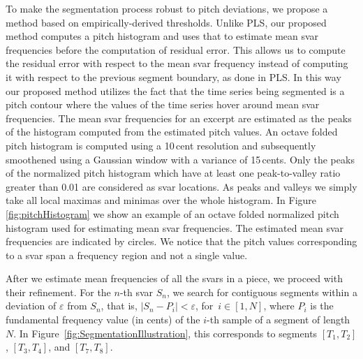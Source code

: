 {To make the segmentation process robust to pitch deviations, we propose a method based on empirically-derived thresholds. Unlike PLS, our proposed method computes a pitch histogram and uses that to estimate mean svar frequencies before the computation of residual error. This allows us to compute the residual error with respect to the mean svar frequency instead of computing it with respect to the previous segment boundary, as done in PLS.  In this way our proposed method utilizes the fact that the time series being segmented is a pitch contour where the values of the time series hover around mean svar frequencies. The mean svar frequencies for an excerpt are estimated as the peaks of the histogram computed from the estimated pitch values. An octave folded pitch histogram is computed using a 10\,cent resolution and subsequently smoothened using a Gaussian window with a variance of 15\,cents. Only the peaks of the normalized pitch histogram which have at least one peak-to-valley ratio greater than 0.01 are considered as svar locations. As peaks and valleys we simply take all local maximas and minimas over the whole histogram. In Figure \ref{fig:pitchHistogram} we show an example of an octave folded normalized  pitch histogram used for estimating mean svar frequencies. The estimated mean svar frequencies are indicated by circles. We notice that the pitch values corresponding to a svar span a frequency region and not a single value.


After we estimate mean frequencies of all the svars in a piece, we proceed with their refinement. For the $n$-th svar $S_n$, we search for contiguous segments within a deviation of $\varepsilon$ from $S_n$, that is, $\vert S_n-P_i \vert < \varepsilon$, for~$i\in[1,N]$, where $P_i$ is the fundamental frequency value (in cents) of the $i$-th sample of a segment of length $N$. In Figure~\ref{fig:SegmentationIllustration}, this corresponds to segments $[T_1,T_2]$, $[T_3,T_4]$, and $[T_7,T_8]$.

}
